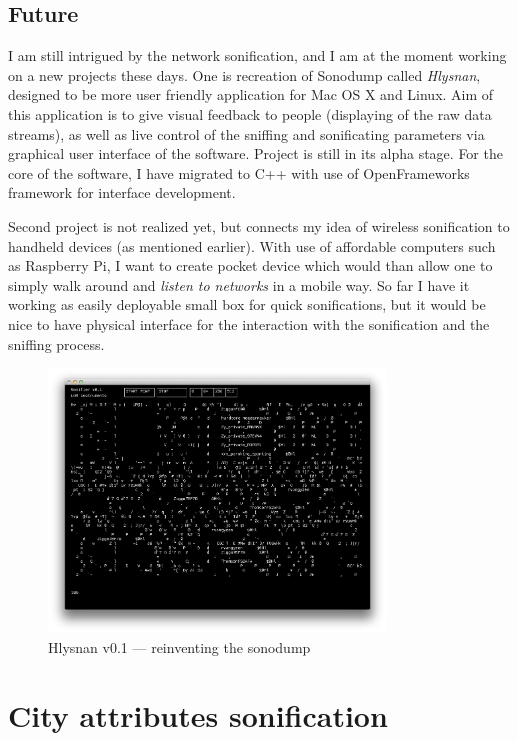 \documentclass[12pt,a4paper,oneside]{report}
\begin{document}
\subsection{Future}
I am still intrigued by the network sonification, and I am at the moment working on a new projects these days. One is recreation of Sonodump called \textit{Hlysnan}, designed to be more user friendly application for Mac OS X and Linux. Aim of this application is to give visual feedback to people (displaying of the raw data streams), as well as live control of the sniffing and sonificating parameters via graphical user interface of the software. Project is still in its alpha stage. For the core of the software, I have migrated to C++ with use of OpenFrameworks framework for interface development.

Second project is not realized yet, but connects my idea of wireless sonification to handheld devices (as mentioned earlier). With use of affordable computers such as Raspberry Pi, I want to create pocket device which would than allow one to simply walk around and \emph{listen to networks} in a mobile way. So far I have it working as easily deployable small box for quick sonifications, but it would be nice to have physical interface for the interaction with the sonification and the sniffing process.

\begin{figure}  
  \centering
    \includegraphics[width=0.8\textwidth]{img/hlysnan}%
	\caption{Hlysnan v0.1 --- reinventing the sonodump}
	\label{fig:hlysnan}
\end{figure}

\clearpage

\section{City attributes sonification}
\end{document}
